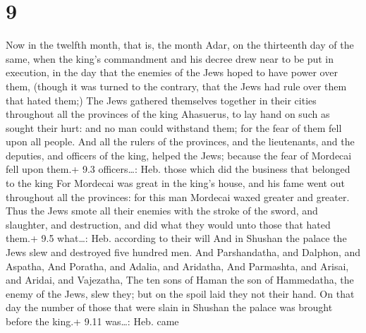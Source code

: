 \hypertarget{section-8}{%
\section{9}\label{section-8}}

 Now in the twelfth month, that is, the month Adar, on the
thirteenth day of the same, when the king's commandment and his decree
drew near to be put in execution, in the day that the enemies of the
Jews hoped to have power over them, (though it was turned to the
contrary, that the Jews had rule over them that hated them;)
 The Jews gathered themselves together in their cities
throughout all the provinces of the king Ahasuerus, to lay hand on such
as sought their hurt: and no man could withstand them; for the fear of
them fell upon all people.  And all the rulers of the
provinces, and the lieutenants, and the deputies, and officers of the
king, helped the Jews; because the fear of Mordecai fell upon them.+ 9.3
officers\ldots: Heb. those which did the business that belonged to the
king  For Mordecai was great in the king's house, and his
fame went out throughout all the provinces: for this man Mordecai waxed
greater and greater.  Thus the Jews smote all their enemies
with the stroke of the sword, and slaughter, and destruction, and did
what they would unto those that hated them.+ 9.5 what\ldots: Heb.
according to their will  And in Shushan the palace the Jews
slew and destroyed five hundred men.  And Parshandatha, and
Dalphon, and Aspatha,  And Poratha, and Adalia, and
Aridatha,  And Parmashta, and Arisai, and Aridai, and
Vajezatha,  The ten sons of Haman the son of Hammedatha,
the enemy of the Jews, slew they; but on the spoil laid they not their
hand.  On that day the number of those that were slain in
Shushan the palace was brought before the king.+ 9.11 was\ldots: Heb.
came

